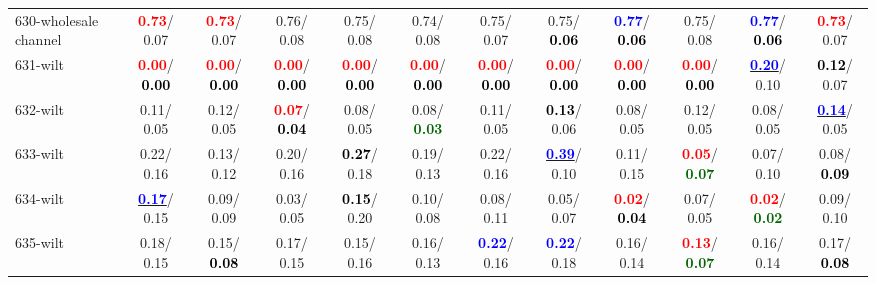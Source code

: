 \begin{table}[h]
\begin{center}
{\begin{tabular}{lc|c|c|c|c|c|c|c|c|c|c}
630-wholesale channel & \textcolor{red}{\textbf{  0.73}}/  0.07 & \textcolor{red}{\textbf{  0.73}}/  0.07 &   0.76/  0.08 &   0.75/  0.08 &   0.74/  0.08 &   0.75/  0.07 &   0.75/\textcolor{black}{\textbf{  0.06}} & \textcolor{blue}{\textbf{  0.77}}/\textcolor{black}{\textbf{  0.06}} &   0.75/  0.08 & \textcolor{blue}{\textbf{  0.77}}/\textcolor{black}{\textbf{  0.06}} & \textcolor{red}{\textbf{  0.73}}/  0.07 \\
631-wilt & \textcolor{red}{\textbf{  0.00}}/\textcolor{black}{\textbf{  0.00}} & \textcolor{red}{\textbf{  0.00}}/\textcolor{black}{\textbf{  0.00}} & \textcolor{red}{\textbf{  0.00}}/\textcolor{black}{\textbf{  0.00}} & \textcolor{red}{\textbf{  0.00}}/\textcolor{black}{\textbf{  0.00}} & \textcolor{red}{\textbf{  0.00}}/\textcolor{black}{\textbf{  0.00}} & \textcolor{red}{\textbf{  0.00}}/\textcolor{black}{\textbf{  0.00}} & \textcolor{red}{\textbf{  0.00}}/\textcolor{black}{\textbf{  0.00}} & \textcolor{red}{\textbf{  0.00}}/\textcolor{black}{\textbf{  0.00}} & \textcolor{red}{\textbf{  0.00}}/\textcolor{black}{\textbf{  0.00}} & \underline{\textcolor{blue}{\textbf{  0.20}}}/  0.10 & \textcolor{black}{\textbf{  0.12}}/  0.07 \\
632-wilt &   0.11/  0.05 &   0.12/  0.05 & \textcolor{red}{\textbf{  0.07}}/\textcolor{black}{\textbf{  0.04}} &   0.08/  0.05 &   0.08/\textcolor{darkgreen}{\textbf{  0.03}} &   0.11/  0.05 & \textcolor{black}{\textbf{  0.13}}/  0.06 &   0.08/  0.05 &   0.12/  0.05 &   0.08/  0.05 & \underline{\textcolor{blue}{\textbf{  0.14}}}/  0.05 \\
633-wilt &   0.22/  0.16 &   0.13/  0.12 &   0.20/  0.16 & \textcolor{black}{\textbf{  0.27}}/  0.18 &   0.19/  0.13 &   0.22/  0.16 & \underline{\textcolor{blue}{\textbf{  0.39}}}/  0.10 &   0.11/  0.15 & \textcolor{red}{\textbf{  0.05}}/\textcolor{darkgreen}{\textbf{  0.07}} &   0.07/  0.10 &   0.08/\textcolor{black}{\textbf{  0.09}} \\
634-wilt & \underline{\textcolor{blue}{\textbf{  0.17}}}/  0.15 &   0.09/  0.09 &   0.03/  0.05 & \textcolor{black}{\textbf{  0.15}}/  0.20 &   0.10/  0.08 &   0.08/  0.11 &   0.05/  0.07 & \textcolor{red}{\textbf{  0.02}}/\textcolor{black}{\textbf{  0.04}} &   0.07/  0.05 & \textcolor{red}{\textbf{  0.02}}/\textcolor{darkgreen}{\textbf{  0.02}} &   0.09/  0.10 \\
635-wilt &   0.18/  0.15 &   0.15/\textcolor{black}{\textbf{  0.08}} &   0.17/  0.15 &   0.15/  0.16 &   0.16/  0.13 & \textcolor{blue}{\textbf{  0.22}}/  0.16 & \textcolor{blue}{\textbf{  0.22}}/  0.18 &   0.16/  0.14 & \textcolor{red}{\textbf{  0.13}}/\textcolor{darkgreen}{\textbf{  0.07}} &   0.16/  0.14 &   0.17/\textcolor{black}{\textbf{  0.08}} \\

\end{tabular}}
\end{center}
\end{table}
